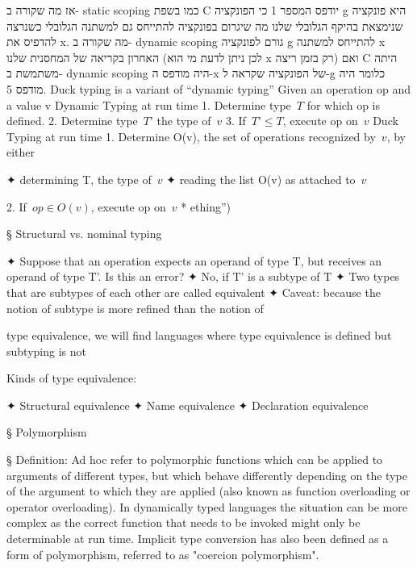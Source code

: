         אז מה שקורה ב- static scoping כמו בשפת C יודפס המספר 1 כי הפונקציה g היא פונקציה שנימצאת בהיקף הגלובלי שלנו מה שיגרום בפונקציה להתייחס גם למשתנה הגלובלי כשנרצה להדפיס את x.
        מה שקורה ב- dynamic scoping גורם לפונקציה g להתייחס למשתנה x האחרון בקריאה של המחסנית שלנו (לכן ניתן לדעת מי הוא x רק בזמן ריצה) ואם C היתה משתמשת ב- dynamic scoping היה מודפס ה-x של הפונקציה שקראה ל-g כלומר היה מודפס 5.
        Duck typing is a variant of “dynamic typing”
        Given an operation op and a value v
        Dynamic Typing at run time
        1. Determine type~$T$ for which op is defined.
        2. Determine type~$T’$ the type of~$v$
        3. If~$T’≤T$, execute op on~$v$
        Duck Typing at run time
        1. Determine O(v), the set of operations recognized by~$v$, by either
        \begin{ציינון}
          ✦ determining T, the type of~$v$
          ✦ reading the list O(v) as attached to~$v$
        \end{ציינון}
        2. If~$op∈O(v)$, execute op on~$v$
        * ething”)

§ Structural vs. nominal typing
        \begin{ציינון}
          ✦ Suppose that an operation expects an operand of type T, but receives
          an operand of type T’. Is this an error?
          ✦ No, if T’ is a subtype of T
          ✦ Two types that are subtypes of each other are called equivalent
          ✦ Caveat: because the notion of subtype is more refined than the notion of
        \end{ציינון}
        type equivalence, we will find languages where type equivalence is
        defined but subtyping is not

        Kinds of type equivalence:
        \begin{ציינון}
          ✦ Structural equivalence
          ✦ Name equivalence
          ✦ Declaration equivalence
        \end{ציינון}

§ Polymorphism

§ Definition: Ad hoc
        refer to polymorphic functions which can be applied to arguments of different types, but which behave differently depending on the type of the argument to which they are applied (also known as function overloading or operator overloading).
        In dynamically typed languages the situation can be more complex as the correct function that needs to be invoked might only be determinable at run time.
        Implicit type conversion has also been defined as a form of polymorphism, referred to as "coercion polymorphism".

